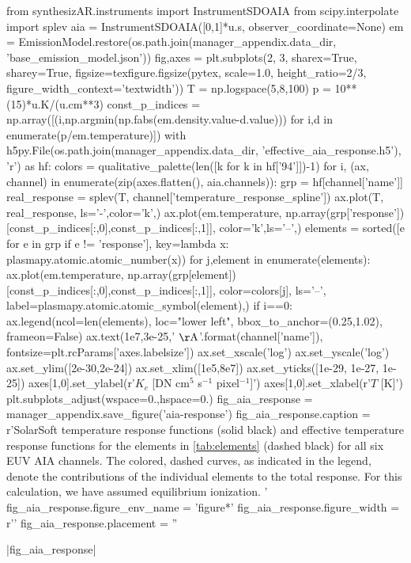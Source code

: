 \begin{pycode}
from synthesizAR.instruments import InstrumentSDOAIA
from scipy.interpolate import splev
aia = InstrumentSDOAIA([0,1]*u.s, observer_coordinate=None)
em = EmissionModel.restore(os.path.join(manager_appendix.data_dir, 'base_emission_model.json'))
fig,axes = plt.subplots(2, 3, sharex=True, sharey=True,
                        figsize=texfigure.figsize(pytex, scale=1.0, height_ratio=2/3,       
                                                  figure_width_context='textwidth'))
T = np.logspace(5,8,100)
p = 10**(15)*u.K/(u.cm**3)
const_p_indices = np.array([(i,np.argmin(np.fabs(em.density.value-d.value))) 
                            for i,d in enumerate(p/em.temperature)])
with h5py.File(os.path.join(manager_appendix.data_dir, 'effective_aia_response.h5'), 'r') as hf:
    colors = qualitative_palette(len([k for k in hf['94']])-1)
    for i, (ax, channel) in enumerate(zip(axes.flatten(), aia.channels)):
        grp = hf[channel['name']]
        real_response = splev(T, channel['temperature_response_spline'])
        ax.plot(T, real_response, ls='-',color='k',)
        ax.plot(em.temperature, 
                np.array(grp['response'])[const_p_indices[:,0],const_p_indices[:,1]],
                color='k',ls='--',)
        elements = sorted([e for e in grp if e != 'response'],
                            key=lambda x: plasmapy.atomic.atomic_number(x))
        for j,element in enumerate(elements):
            ax.plot(em.temperature, 
                    np.array(grp[element])[const_p_indices[:,0],const_p_indices[:,1]],
                    color=colors[j], ls='--', label=plasmapy.atomic.atomic_symbol(element),)
        if i==0:
            ax.legend(ncol=len(elements), loc="lower left", bbox_to_anchor=(0.25,1.02),
                        frameon=False)
        ax.text(1e7,3e-25,'{} $\mathrm{{\AA}}$'.format(channel['name']),
                fontsize=plt.rcParams['axes.labelsize'])
ax.set_xscale('log')
ax.set_yscale('log')
ax.set_ylim([2e-30,2e-24])
ax.set_xlim([1e5,8e7])
ax.set_yticks([1e-29, 1e-27, 1e-25])
axes[1,0].set_ylabel(r'$K_c$ [DN cm$^5$ s$^{-1}$ pixel$^{-1}$]')
axes[1,0].set_xlabel(r'$T$ [K]')
plt.subplots_adjust(wspace=0.,hspace=0.)
fig_aia_response = manager_appendix.save_figure('aia-response')
fig_aia_response.caption = r'SolarSoft temperature response functions (solid black) and effective temperature response functions for the elements in \autoref{tab:elements} (dashed black) for all six EUV AIA channels. The colored, dashed curves, as indicated in the legend, denote the contributions of the individual elements to the total response. For this calculation, we have assumed equilibrium ionization. '
fig_aia_response.figure_env_name = 'figure*'
fig_aia_response.figure_width = r'\textwidth'
fig_aia_response.placement = ''
\end{pycode}
|fig_aia_response|

